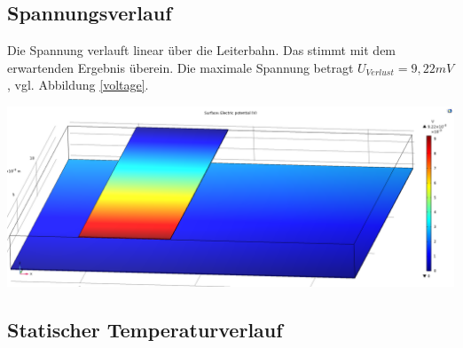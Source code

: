 \documentclass[10pt,a4paper,oneside,abstracton]{scrartcl}
\newenvironment{Figure}
  {\par\medskip\noindent\minipage{\linewidth}}
  {\endminipage\par\medskip}
\begin{document}
\begin{multicols}{2}
\subsection{Spannungsverlauf}
Die Spannung verlauft linear über die Leiterbahn. 
Das stimmt mit dem erwartenden Ergebnis überein. 
Die maximale Spannung betragt $ U_{Verlust} = 9,22mV$, vgl. Abbildung \ref{voltage}.

\begin{Figure}
	\includegraphics[width=\textwidth]{Bilder/voltage.png}
	\label{voltage}
\end{Figure}

\subsection{Statischer Temperaturverlauf}


\end{multicols}
\end{document}
